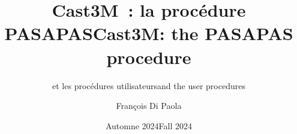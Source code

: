 \documentclass[xcolor={dvipsnames}]{beamer}
\title{Cast3M~: la procédure PASAPAS}
\subtitle{et les procédures utilisateurs}
\date{Automne 2024}}
\title{Cast3M: the PASAPAS procedure}
\subtitle{and the user procedures}
\date{Fall 2024}}
\author{François Di Paola}
\institute{CEA Saclay,\\
\url{http://www-cast3m.cea.fr}}
\newcommand{\fe}[2]{\justfor{french}{#1}\justfor{english}{#2}}
\newcommand{\red}[1]{\textcolor{red}{#1}}
\newcommand{\blue}[1]{\textcolor{blue}{#1}}
\begin{document}
\begin{frame}
  \titlepage
\end{frame}


% 
% 
% 
% 
% 
% 
% 
% 
% 

\end{document}
